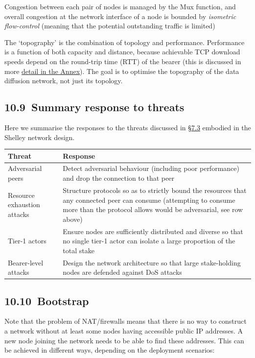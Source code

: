 \documentclass[]{article}
\begin{document}
Congestion between each pair of nodes is managed by the Mux function,
and overall congestion at the network interface of a node is bounded by
\emph{isometric flow-control} (meaning that the potential outstanding
traffic is limited)

The `topography' is the combination of topology and performance.
Performance is a function of both capacity and distance, because
achievable TCP download speeds depend on the round-trip time (RTT) of
the bearer (this is discussed in more
\protect\hyperlink{tcp-rpc-response-behavior}{{detail in the Annex}}).
The goal is to optimise the topography of the data diffusion network,
not just its topology.

\hypertarget{summary-response-to-threats}{%
\subsection{​10.9​~Summary response to
threats}\label{summary-response-to-threats}}

Here we summarise the responses to the threats discussed in
\protect\hyperlink{high-level-threat-model}{{§7.3}} embodied in the
Shelley network design.

\begin{longtable}[]{@{}ll@{}}
\toprule
\textbf{Threat} & \textbf{Response}\tabularnewline
\midrule
\endhead
Adversarial peers & Detect adversarial behaviour (including poor
performance) and drop the connection to that peer\tabularnewline
Resource exhaustion attacks & Structure protocols so as to strictly
bound the resources that any connected peer can consume (attempting to
consume more than the protocol allows would be adversarial, see row
above)\tabularnewline
Tier-1 actors & Ensure nodes are sufficiently distributed and diverse so
that no single tier-1 actor can isolate a large proportion of the total
stake\tabularnewline
Bearer-level attacks & Design the network architecture so that large
stake-holding nodes are defended against DoS attacks\tabularnewline
\bottomrule
\end{longtable}

\hypertarget{bootstrap}{%
\subsection{​10.10​~Bootstrap}\label{bootstrap}}

Note that the problem of NAT/firewalls means that there is no way to
construct a network without at least some nodes having accessible public
IP addresses. A new node joining the network needs to be able to find
these addresses. This can be achieved in different ways, depending on
the deployment scenarios:
\end{document}
